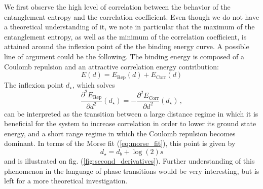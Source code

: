 \documentclass[reprint, amsmath, amssymb, aps, pra]{revtex4-2}
\begin{document}
    We first observe the high level of correlation between the behavior of the entanglement entropy and the correlation coefficient. Even though we do not have a theoretical understanding of it, we note in particular that the maximum of the entanglement entropy, as well as the minimum of the correlation coefficient, is attained around the inflexion point of the the binding energy curve. A possible line of argument could be the following. The binding energy is composed of a Coulomb repulsion and an attractive correlation energy contribution:
    \begin{equation}
        E(d)=E_\text{Rep}(d)+E_\text{Corr}(d)
    \end{equation}
    The inflexion point $d_\star$, which solves
    \begin{equation}
        \frac{\partial^2 E_\text{Rep}}{\partial d^2}(d_\star) = -\frac{\partial^2 E_\text{Corr}}{\partial d^2}(d_\star)\,,
    \end{equation}
    can be interpreted as the transition between a large distance regime in which it is beneficial for the system to increase correlation in order to lower its ground state energy, and a short range regime in which the Coulomb repulsion becomes dominant. In terms of the Morse fit (\ref{eq:morse_fit}), this point is given by
    \begin{equation}
        d_\star = d_b + \log(2)s
    \end{equation}
    and is illustrated on fig. (\ref{fig:second_derivatives}). Further understanding of this phenomenon in the language of phase transitions would be very interesting, but is left for a more theoretical investigation.
\end{document}
